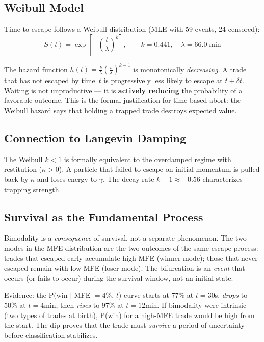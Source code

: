 \documentclass[11pt,a4paper]{article}
\begin{document}
\subsection{Weibull Model}

Time-to-escape follows a Weibull distribution (MLE with 59 events, 24 censored):
\begin{equation}
S(t) = \exp\!\left[-\left(\frac{t}{\lambda}\right)^k\right], \qquad k = 0.441, \quad \lambda = 66.0\;\text{min}
\end{equation}

\begin{tcolorbox}[thmbox, title=Infant Mortality Pattern ($k < 1$)]
The hazard function $h(t) = \frac{k}{\lambda}\left(\frac{t}{\lambda}\right)^{k-1}$ is monotonically \emph{decreasing}. A trade that has not escaped by time~$t$ is progressively less likely to escape at $t + \delta t$. Waiting is not unproductive --- it is \textbf{actively reducing} the probability of a favorable outcome. This is the formal justification for time-based abort: the Weibull hazard says that holding a trapped trade destroys expected value.
\end{tcolorbox}

\subsection{Connection to Langevin Damping}

The Weibull $k < 1$ is formally equivalent to the overdamped regime with restitution ($\kappa > 0$). A particle that failed to escape on initial momentum is pulled back by $\kappa$ and loses energy to $\gamma$. The decay rate $k - 1 \approx -0.56$ characterizes trapping strength.

\subsection{Survival as the Fundamental Process}

Bimodality is a \emph{consequence} of survival, not a separate phenomenon. The two modes in the MFE distribution are the two outcomes of the same escape process: trades that escaped early accumulate high MFE (winner mode); those that never escaped remain with low MFE (loser mode). The bifurcation is an \emph{event} that occurs (or fails to occur) during the survival window, not an initial state.

Evidence: the P(win $|$ MFE $= 4\%$, $t$) curve starts at 77\% at $t = 30$s, \emph{drops} to 50\% at $t = 4$min, then \emph{rises} to 97\% at $t = 12$min. If bimodality were intrinsic (two types of trades at birth), P(win) for a high-MFE trade would be high from the start. The dip proves that the trade must \emph{survive} a period of uncertainty before classification stabilizes.
\end{document}

